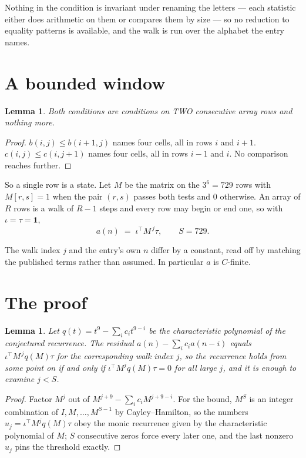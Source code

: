 \documentclass[11pt,a4paper]{article}
\theoremstyle{plain}
\newtheorem{lemma}[theorem]{Lemma}
\theoremstyle{definition}
\begin{document}
Nothing in the condition is invariant under renaming the letters --- each statistic either does
arithmetic on them or compares them by size --- so no reduction to equality patterns is
available, and the walk is run over the alphabet the entry names.

\section{A bounded window}

\begin{lemma}\label{lem:win}
Both conditions are conditions on TWO consecutive array rows and nothing more.
\end{lemma}

\begin{proof}
$b(i,j)\le b(i{+}1,j)$ names four cells, all in rows $i$ and $i+1$. $c(i,j)\le c(i,j{+}1)$
names four cells, all in rows $i-1$ and $i$. No comparison reaches further.
\end{proof}

So a single row is a state. Let $M$ be the matrix on the $3^{6}=729$ rows with
$M[r,s]=1$ when the pair $(r,s)$ passes both tests and $0$ otherwise. An array of $R$ rows is a
walk of $R-1$ steps and every row may begin or end one, so with $\iota=\tau=\mathbf{1}$,
\[
a(n)\;=\;\iota^{\!\top}M^{\,j}\tau ,\qquad S=729.
\]

The walk index $j$ and the entry's own $n$ differ by a constant, read off by matching the
published terms rather than assumed. In particular $a$ is $C$-finite.

\section{The proof}

\begin{lemma}\label{lem:crit}
Let $q(t)=t^{9}-\sum_i c_it^{9-i}$ be the characteristic polynomial of the
conjectured recurrence. The residual $a(n)-\sum_ic_ia(n-i)$ equals
$\iota^{\!\top}M^{\,j}q(M)\tau$ for the corresponding walk index $j$, so the recurrence
holds from some point on if and only if $\iota^{\!\top}M^{j}q(M)\tau=0$ for all large $j$,
and it is enough to examine $j<S$.
\end{lemma}

\begin{proof}
Factor $M^{j}$ out of $M^{j+9}-\sum_ic_iM^{j+9-i}$. For the bound, $M^{S}$
is an integer combination of $I,M,\dots,M^{S-1}$ by Cayley--Hamilton, so the numbers
$u_j=\iota^{\!\top}M^{j}q(M)\tau$ obey the monic recurrence given by the characteristic
polynomial of $M$; $S$ consecutive zeros force every later one, and the last nonzero $u_j$
pins the threshold exactly.
\end{proof}
\end{document}
